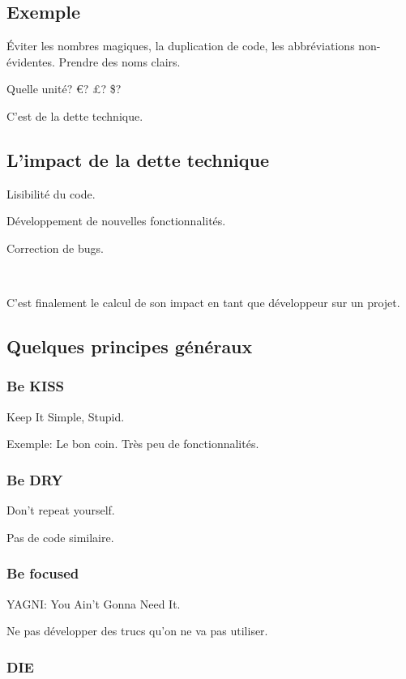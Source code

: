 \documentclass[a4paper,11pt]{article}
\begin{document}
\subsection{Exemple}

Éviter les nombres magiques, la duplication de code, les abbréviations
non-évidentes. Prendre des noms clairs.

Quelle unité? \euro? £? \$?

C'est de la dette technique.

\subsection{L'impact de la dette technique}

Lisibilité du code.

Développement de nouvelles fonctionnalités.

Correction de bugs.

\

C'est finalement le calcul de son impact en tant que développeur sur un projet.

\subsection{Quelques principes généraux}
\subsubsection{Be KISS}

Keep It Simple, Stupid.

Exemple: Le bon coin. Très peu de fonctionnalités.

\subsubsection{Be DRY}

Don't repeat yourself.

Pas de code similaire.

\subsubsection{Be focused}

YAGNI: You Ain't Gonna Need It.

Ne pas développer des trucs qu'on ne va pas utiliser.

\subsubsection{DIE}
\end{document}
